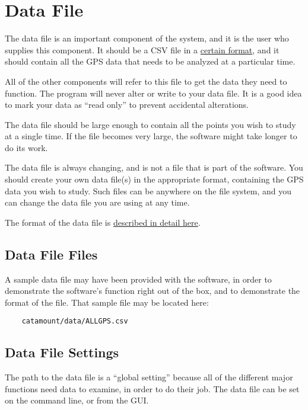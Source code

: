 \chapter{Data File}
\hypertarget{data-file}{}

The data file is an important component of the system, and it is the
user who supplies this component. It should be a CSV file in a
\hyperlink{data-file-format}{certain format}, and it should contain
all the GPS data that needs to be analyzed at a particular time.

All of the other components will refer to this file to get the data
they need to function. The program will never alter or write to your
data file. It is a good idea to mark your data as ``read only'' to
prevent accidental alterations.

The data file should be large enough to contain all the points you
wish to study at a single time. If the file becomes very large, the
software might take longer to do its work.

The data file is always changing, and is not a file that is part of
the software. You should create your own data file(s) in the
appropriate format, containing the GPS data you wish to study. Such
files can be anywhere on the file system, and you can change the data
file you are using at any time.

The format of the data file is \hyperlink{data-file-format}{described in detail here}.

\section{Data File Files}

A sample data file may have been provided with the software, in order
to demonstrate the software's function right out of the box, and to
demonstrate the format of the file. That sample file may be located
here:

\begin{verbatim}
    catamount/data/ALLGPS.csv
\end{verbatim}

\section{Data File Settings}

The path to the data file is a ``global setting'' because all of the
different major functions need data to examine, in order to do their
job. The data file can be set on the command line, or from the GUI.

